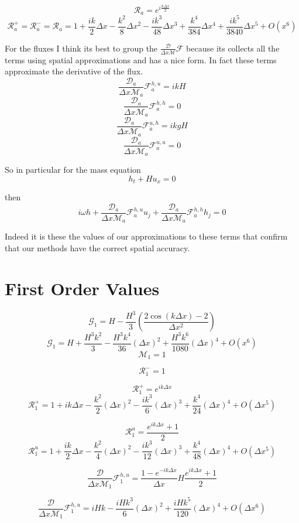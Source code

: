 \documentclass[12pt]{article}
\begin{document}
\[\mathcal{R}_a = e^{i \frac{k\Delta x}{2}}\]
\[\mathcal{R}_a^+ = \mathcal{R}_a^-=\mathcal{R}_a = 1 + \frac{ik}{2}\Delta x   - \frac{k^2}{8}\Delta x^2 - \frac{ik^3}{48}\Delta x^3 + \frac{k^4}{384}\Delta x^4 + \frac{ik^5}{3840}\Delta x^5 + O(x^{6})\]


For the fluxes I think its best to group the $ \frac{\mathcal{D}}{\Delta x\mathcal{M}}\mathcal{F}$ because its collects all the terms using spatial approximations and has a nice form. In fact these terms approximate the derivative of the flux.
\[\frac{\mathcal{D}_a}{\Delta x\mathcal{M}_a}\mathcal{F}^{h,u}_a = ikH\]
\[\frac{\mathcal{D}_a}{\Delta x\mathcal{M}_a}\mathcal{F}^{h,h}_a = 0\]
\[\frac{\mathcal{D}_a}{\Delta x\mathcal{M}_a}\mathcal{F}^{u,h}_a = ikgH\]
\[\frac{\mathcal{D}_a}{\Delta x\mathcal{M}_a}\mathcal{F}^{u,u}_a = 0\]

So in particular for the mass equation
\[h_t + Hu_x = 0\]

then
\[ i \omega h + \frac{\mathcal{D}_a}{\Delta x\mathcal{M}_a}\mathcal{F}^{h,u}_a u_j + \frac{\mathcal{D}_a}{\Delta x\mathcal{M}_a}\mathcal{F}^{h,h}_a h_j = 0  \]

Indeed it is these the values of our approximations to these terms that confirm that our methods have the correct spatial accuracy.

\section{First Order Values }
\[\mathcal{G}_1 = H - \frac{H^3}{3}\left(\frac{ 2\cos\left(k\Delta x\right) - 2 }{\Delta x^2}\right)\]
\[\mathcal{G}_1 = H +\frac{H^3 k^2}{3}  -\frac{H^3 k^4}{36}(\Delta x)^2 + \frac{H^3 k^6}{1080}(\Delta x)^4 + O(x^{6})\]
\[\mathcal{M}_1 = 1\]

\[\mathcal{R}^-_1 =  1\]

\[\mathcal{R}^+_1 = e^{ik\Delta x}\]
\[\mathcal{R}^+_1 = 1 + i k\Delta x  - \frac{k^2}{2} (\Delta x)^2 - \frac{ik^3}{6} (\Delta x)^3 + \frac{k^4}{24} (\Delta x)^4 +  O(\Delta x^5)\]

\[\mathcal{R}^u_1 = \frac{e^{ik\Delta x } + 1}{2} \]
\[\mathcal{R}^u_1 = 1 + \frac{ik}{2}\Delta x - \frac{k^2}{4} (\Delta x)^2 - \frac{i k^3}{12} ( \Delta x)^3 + \frac{k^4}{48} ( \Delta x)^4+  O( \Delta x^5)\]


\[\frac{\mathcal{D}}{\Delta x\mathcal{M}_1}\mathcal{F}^{h,u}_1 = \frac{1 -e^{-ik\Delta x}}{\Delta x} H \frac{e^{ik\Delta x } + 1}{2}\]

\[\frac{\mathcal{D}}{\Delta x\mathcal{M}_1}\mathcal{F}^{h,u}_1 = iHk  - \frac{iHk^3}{6}( \Delta x)^2 + \frac{iHk^5}{120}( \Delta x)^4 +  O( \Delta x^6)\]
\end{document}
